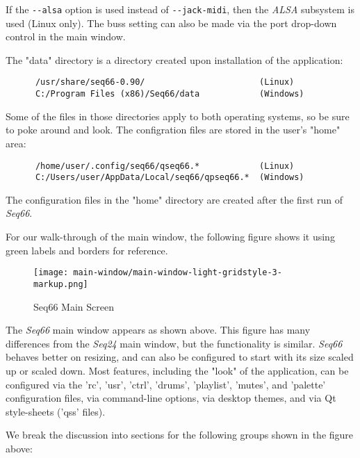\documentclass[
 11pt,
 twoside,
 a4paper,
 final                                 %
]{article}
\begin{document}
   If the \texttt{-{}-alsa} option is used instead of
   \texttt{-{}-jack-midi}, then the \textsl{ALSA} subsystem is used
   (Linux only).
   The buss setting can also be made via the port drop-down control
   in the main window.

   The "data" directory is a directory created upon installation of the
   application:

   \begin{verbatim}
      /usr/share/seq66-0.90/                       (Linux)
      C:/Program Files (x86)/Seq66/data            (Windows)
   \end{verbatim}

   Some of the files in those directories apply to both operating systems, so
   be sure to poke around and look.
   The configration files are stored in the user's "home" area:

   \begin{verbatim}
      /home/user/.config/seq66/qseq66.*            (Linux)
      C:/Users/user/AppData/Local/seq66/qpseq66.*  (Windows)
   \end{verbatim}

   The configuration files in the "home" directory
   are created after the first run of \textsl{Seq66}.

   For our walk-through of the main window, the following figure
   shows it using green labels and borders for reference.

\begin{figure}[H]
   \centering 
   \texttt{[image: main-window/main-window-light-gridstyle-3-markup.png]}
   \caption{Seq66 Main Screen}
   \label{fig:main_screen}
\end{figure}

   The \textsl{Seq66} main window appears as shown above.
   This figure has many differences from the \textsl{Seq24} main window,
   but the functionality is similar.
   \textsl{Seq66} behaves better on resizing, and can also
   be configured to start with its size scaled up or scaled down.
   Most features, including the "look" of the application,
   can be configured via the 'rc', 'usr', 'ctrl', 'drums', 'playlist', 'mutes',
   and 'palette' configuration files, via command-line options, via
   desktop themes, and via Qt style-sheets ('qss' files).

   We break the discussion into sections for the following
   groups shown in the figure above:
\end{document}
